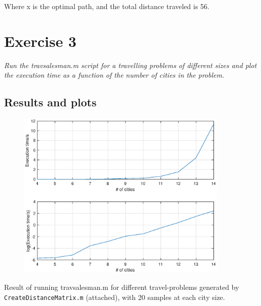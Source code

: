 \documentclass{article}
\begin{document}
  \noindent
  Where x is the optimal path, and the total distance traveled is 56.

  \newpage

\section*{Exercise 3}

  \textit{Run the travsalesman.m script for a travelling problems of different
  sizes and plot the execution time as a function of the number of cities in
  the problem.}

  \subsection*{Results and plots}

  \begin{figure}[!h]
    \centering
    \includegraphics[width=0.9\textwidth]{4_14_20samples.eps}
  \end{figure}

  \noindent
  Result of running travsalesman.m for different travel-problems generated by
  \texttt{CreateDistanceMatrix.m} (attached), with 20 samples at each city
  size.
\end{document}

